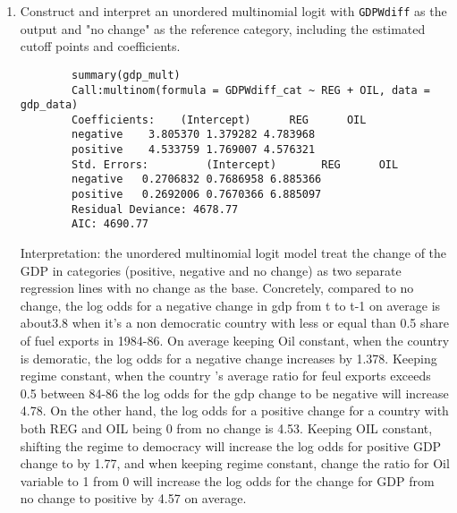 \documentclass[12pt,letterpaper]{article}
\begin{document}
\begin{enumerate}
	\item Construct and interpret an unordered multinomial logit with \texttt{GDPWdiff} as the output and "no change" as the reference category, including the estimated cutoff points and coefficients.
	 
	\begin{lstlisting}		
		summary(gdp_mult)
		Call:multinom(formula = GDPWdiff_cat ~ REG + OIL, data = gdp_data)
		Coefficients:    (Intercept)      REG      OIL
		negative    3.805370 1.379282 4.783968
		positive    4.533759 1.769007 4.576321
		Std. Errors:         (Intercept)       REG      OIL
		negative   0.2706832 0.7686958 6.885366
		positive   0.2692006 0.7670366 6.885097
		Residual Deviance: 4678.77 
		AIC: 4690.77 
		\end{lstlisting}
Interpretation: the unordered multinomial logit model treat the change of the GDP in categories (positive, negative and no change) as two separate regression lines with no change as the base. Concretely, compared to no change,  the log odds for a negative change in gdp from t to t-1 on average is about3.8 when it's a non democratic country with less or equal than 0.5 share of fuel exports in 1984-86. On average keeping Oil constant, when the country is demoratic, the log odds for a negative change increases by 1.378. Keeping regime constant, when the country 's average ratio for feul exports exceeds 0.5 between 84-86 the log odds for the gdp change to be negative will increase 4.78. 
On the other hand, the log odds for a positive change for a country with both REG and OIL being 0 from no change is 4.53. Keeping OIL constant, shifting the regime to  democracy will increase the log odds for positive GDP change to by 1.77, and when keeping regime constant, change the ratio for Oil variable to 1 from 0 will increase the log odds for the change for GDP from no change to positive by 4.57 on average.


\end{enumerate}
\end{document}
